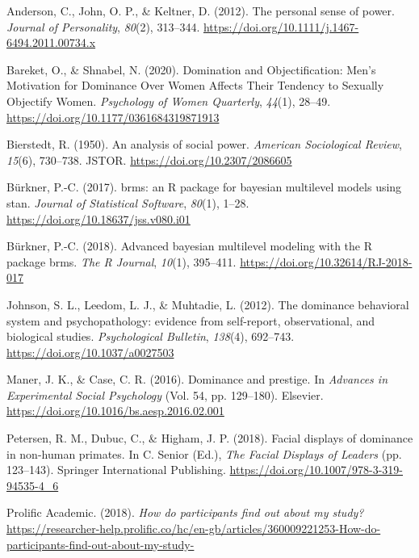 \documentclass[
  english,
  a4paper,floatsintext]{apa7}
\newlength{\cslhangindent}
\newlength{\cslentryspacingunit} %
\newenvironment{CSLReferences}[2] %
 {%
  \setlength{\parindent}{0pt}
  \ifodd #1
  \let\oldpar\par
  \def\par{\hangindent=\cslhangindent\oldpar}
  \fi
  \setlength{\parskip}{#2\cslentryspacingunit}
 }%
 {}
\begin{document}
\hypertarget{refs}{}
\begin{CSLReferences}{1}{0}
\leavevmode{}%
Anderson, C., John, O. P., \& Keltner, D. (2012). The personal sense of power. \emph{Journal of Personality}, \emph{80}(2), 313--344. \url{https://doi.org/10.1111/j.1467-6494.2011.00734.x}

\leavevmode{}%
Bareket, O., \& Shnabel, N. (2020). Domination and Objectification: Men's Motivation for Dominance Over Women Affects Their Tendency to Sexually Objectify Women. \emph{Psychology of Women Quarterly}, \emph{44}(1), 28--49. \url{https://doi.org/10.1177/0361684319871913}

\leavevmode{}%
Bierstedt, R. (1950). An analysis of social power. \emph{American Sociological Review}, \emph{15}(6), 730--738. JSTOR. \url{https://doi.org/10.2307/2086605}

\leavevmode{}%
Bürkner, P.-C. (2017). brms: an R package for bayesian multilevel models using stan. \emph{Journal of Statistical Software}, \emph{80}(1), 1--28. \url{https://doi.org/10.18637/jss.v080.i01}

\leavevmode{}%
Bürkner, P.-C. (2018). Advanced bayesian multilevel modeling with the R package brms. \emph{The R Journal}, \emph{10}(1), 395--411. \url{https://doi.org/10.32614/RJ-2018-017}

\leavevmode{}%
Johnson, S. L., Leedom, L. J., \& Muhtadie, L. (2012). The dominance behavioral system and psychopathology: evidence from self-report, observational, and biological studies. \emph{Psychological Bulletin}, \emph{138}(4), 692--743. \url{https://doi.org/10.1037/a0027503}

\leavevmode{}%
Maner, J. K., \& Case, C. R. (2016). Dominance and prestige. In \emph{Advances in Experimental Social Psychology} (Vol. 54, pp. 129--180). Elsevier. \url{https://doi.org/10.1016/bs.aesp.2016.02.001}

\leavevmode{}%
Petersen, R. M., Dubuc, C., \& Higham, J. P. (2018). Facial displays of dominance in non-human primates. In C. Senior (Ed.), \emph{The Facial Displays of Leaders} (pp. 123--143). Springer International Publishing. \url{https://doi.org/10.1007/978-3-319-94535-4_6}

\leavevmode{}%
Prolific Academic. (2018). \emph{How do participants find out about my study?} \url{https://researcher-help.prolific.co/hc/en-gb/articles/360009221253-How-do-participants-find-out-about-my-study-}


\end{CSLReferences}
\end{document}
